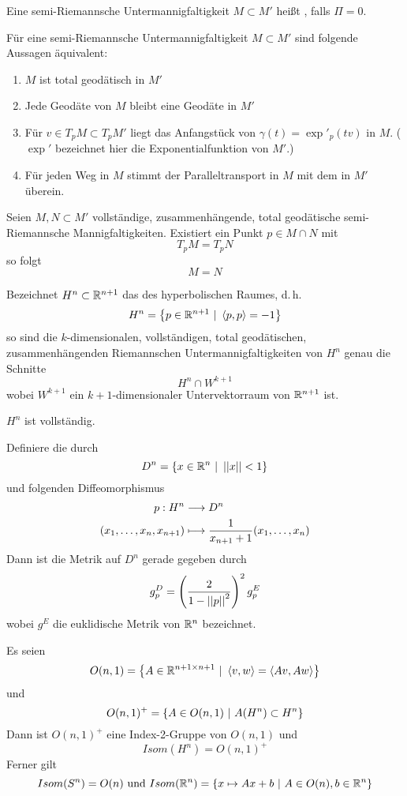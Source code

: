 \documentclass{book}
\begin{document}
\Def{}
Eine semi-Riemannsche Untermannigfaltigkeit $M \subset M'$ heißt , falls $\Pi = 0$.

\Prop{}
Für eine semi-Riemannsche Untermannigfaltigkeit $M \subset M'$ sind folgende Aussagen äquivalent:
\begin{enumerate}[1.)]
\item $M$ ist total geodätisch in $M'$
\item Jede Geodäte von $M$ bleibt eine Geodäte in $M'$
\item Für $v \in T_pM \subset T_pM'$ liegt das Anfangstück von $\gamma(t) = \exp'_p(tv)$ in $M$. ($\exp'$ bezeichnet hier die Exponentialfunktion von $M'$.)
\item Für jeden Weg in $M$ stimmt der Paralleltransport in $M$ mit dem in $M'$ überein.
\end{enumerate}

\Prop{}
Seien $M, N \subset M'$ vollständige, zusammenhängende, total geodätische semi-Riemannsche Mannigfaltigkeiten. Existiert ein Punkt $p \in M\cap N$ mit
\[ T_pM = T_pN \] 
so folgt
\[ M = N\]

\Prop{}
Bezeichnet $H^n \subset \mathbb{R}^{n+1}$ das  des hyperbolischen Raumes, d.\,h.
\[ H^n = \set{p \in \R^{n+1}}{\shrp{p,p} = -1}\]
so sind die $k$-dimensionalen, vollständigen, total geodätischen, zusammenhängenden Riemannschen Untermannigfaltigkeiten von $H^n$ genau die Schnitte
\[ H^n \cap W^{k+1}\]
wobei $W^{k+1}$ ein $k+1$-dimensionaler Untervektorraum von $\mathbb{R}^{n+1}$ ist.

\Kor{}
$H^n$ ist vollständig.

Definiere die  durch
\[D^n = \set{x \in \R^n}{\norm{x} < 1} \]
und folgenden Diffeomorphismus
\begin{align*}
p : H^n & \overset{}{\longrightarrow} D^n\\
(x_1, \ldots, x_n, x_{n+1}) & \longmapsto \frac{1}{x_{n+1} + 1} (x_1,\ldots, x_n) 
\end{align*}
Dann ist die Metrik auf $D^n$ gerade gegeben durch
\[ g^D_p = \left(\frac{2}{1 - \left|\left|p\right|\right|^2}\right)^2g^E_p \]
wobei $g^E$ die euklidische Metrik von $\mathbb{R}^n$ bezeichnet.


\Lem{}
Es seien
\[ O(n,1) = \set{A \in \R^{n+1\times n + 1}}{ \shrp{v,w} = \shrp{Av, Aw} }\]
und
\[ O(n,1)^+ = \set{A \in O(n,1)}{A (H^n) \subset H^n } \]
Dann ist $O(n,1)^+$ eine Index-2-Gruppe von $O(n,1)$ und
\[ Isom(H^n) = O(n,1)^+ \]
Ferner gilt
\[ Isom(S^n) = O(n) \text{ und } Isom(\R^n) = \set{x\mapsto Ax + b}{A \in O(n), b\in \R^n } \]
\end{document}
